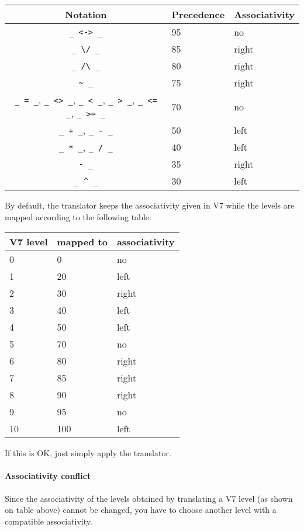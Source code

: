 \documentclass[11pt,a4paper]{article}
\begin{document}
\begin{center}
\begin{tabular}{|cll|}
\hline
Notation & Precedence & Associativity \\
\hline
\verb!_ <-> _! & 95 & no \\
\verb!_ \/ _!  & 85 & right \\
\verb!_ /\ _!  & 80 & right \\
\verb!~ _!   & 75 & right \\
\verb!_ = _!, \verb!_ <> _!, \verb!_ < _!, \verb!_ > _!,
  \verb!_ <= _!, \verb!_ >= _!   & 70 & no \\
\verb!_ + _!, \verb!_ - _!   & 50 & left \\
\verb!_ * _!, \verb!_ / _!   & 40 & left \\
\verb!- _!  & 35 & right \\
\verb!_ ^ _!   & 30 & left \\
\hline
\end{tabular}
\end{center}


  By default, the translator keeps the associativity given in V7 while
the levels are mapped according to the following table:

\begin{center}
\begin{tabular}{l|l|l}
V7 level & mapped to & associativity \\
\hline
0 & 0 & no \\
1 & 20 & left \\
2 & 30 & right \\
3 & 40 & left \\
4 & 50 & left \\
5 & 70 & no \\
6 & 80 & right \\
7 & 85 & right \\
8 & 90 & right \\
9 & 95 & no \\
10 & 100 & left
\end{tabular}
\end{center}

If this is OK, just simply apply the translator.


\paragraph{Associativity conflict}

  Since the associativity of the levels obtained by translating a V7
level (as shown on table above) cannot be changed, you have to choose
another level with a compatible associativity.
\end{document}
